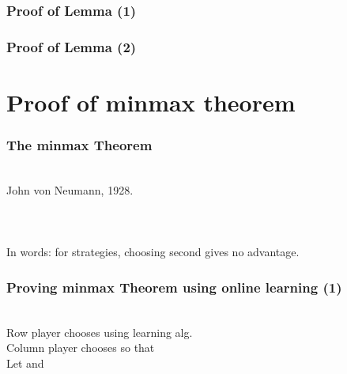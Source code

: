 \documentclass{beamer}
\begin{document}
\begin{frame}
\frametitle{Proof of Lemma (1)}
\end{frame}


\begin{frame}
\frametitle{Proof of Lemma (2)}
\end{frame}


\section{Proof of minmax theorem}

\begin{frame}
\frametitle{The minmax Theorem}
~\\
John von Neumann, 1928.
\\ ~ \\ \pause
\R{\[ \minp \maxq \mpq \leq \maxq \minp \mpq \]}
\\ ~ \\ \pause
In words: for  strategies, choosing second gives no advantage.
\end{frame}

\begin{frame}
\frametitle{Proving minmax Theorem using online learning (1)}
~\\
Row player chooses  using learning alg. \\ \pause 
Column player chooses   so that
\R{$\Qt = \arg \maxq \mptq$}
\\ \pause
Let  and
\\ \pause
\R{\em
\[
\begin{array}{rcll}
{\displaystyle{\minp \maxq \trans{\P}\M\Q}} 
 &\leq&
\displaystyle{\maxq \trans{\Pa}\M\Q} & \nextline
\pause
  &=&
\displaystyle{\maxq \frac{1}{T} \sumt \trans{\Pt}\M\Q}
                       &\mbox{\rm by definition of~~\Pa}\nextline
\pause
  &\leq&
\displaystyle{\frac{1}{T} \sumt \maxq \trans{\Pt}\M\Q} &
\end{array}
\]
}
\end{frame}
\end{document}
